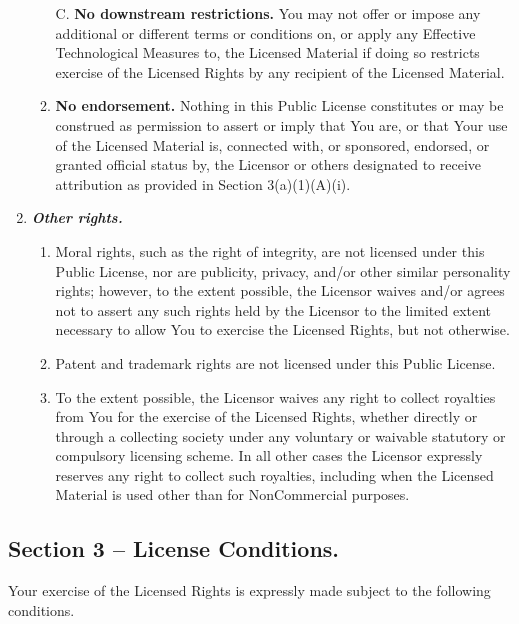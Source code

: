 \documentclass[]{book}
\begin{document}
\begin{enumerate}
\begin{enumerate}
    C. \textbf{No downstream restrictions.} You may not offer or impose any additional or different terms or conditions on, or apply any Effective Technological Measures to, the Licensed Material if doing so restricts exercise of the Licensed Rights by any recipient of the Licensed Material.
  \item
    \textbf{No endorsement.} Nothing in this Public License constitutes or may be construed as permission to assert or imply that You are, or that Your use of the Licensed Material is, connected with, or sponsored, endorsed, or granted official status by, the Licensor or others designated to receive attribution as provided in Section 3(a)(1)(A)(i).
  \end{enumerate}
\item
  \textbf{\emph{Other rights.}}

  \begin{enumerate}
  \def\labelenumii{\arabic{enumii}.}
  \item
    Moral rights, such as the right of integrity, are not licensed under this Public License, nor are publicity, privacy, and/or other similar personality rights; however, to the extent possible, the Licensor waives and/or agrees not to assert any such rights held by the Licensor to the limited extent necessary to allow You to exercise the Licensed Rights, but not otherwise.
  \item
    Patent and trademark rights are not licensed under this Public License.
  \item
    To the extent possible, the Licensor waives any right to collect royalties from You for the exercise of the Licensed Rights, whether directly or through a collecting society under any voluntary or waivable statutory or compulsory licensing scheme. In all other cases the Licensor expressly reserves any right to collect such royalties, including when the Licensed Material is used other than for NonCommercial purposes.
  \end{enumerate}
\end{enumerate}

\hypertarget{section-3-license-conditions.}{%
\subsection{Section 3 -- License Conditions.}\label{section-3-license-conditions.}}

Your exercise of the Licensed Rights is expressly made subject to the following conditions.
\end{document}
